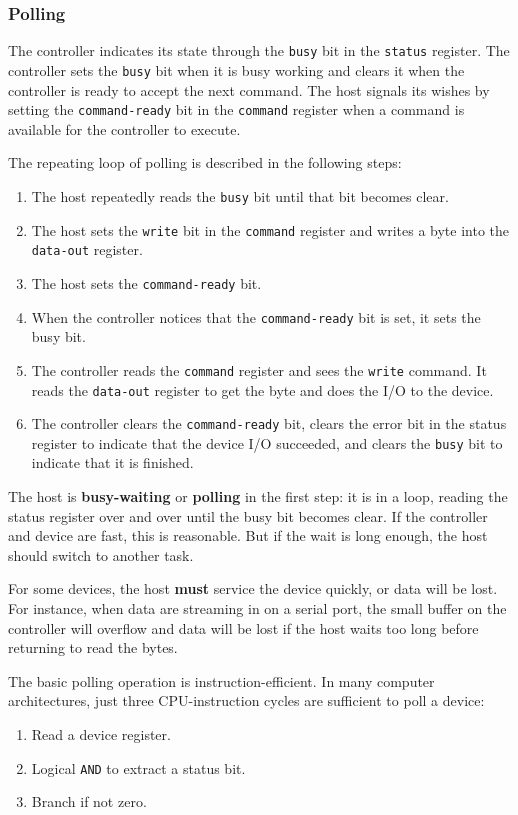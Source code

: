\subsubsection{Polling}\label{subsubsec:Polling}
The controller indicates its state through the \texttt{busy} bit in the \texttt{status} register.
The controller sets the \texttt{busy} bit when it is busy working and clears it when the controller is ready to accept the next command.
The host signals its wishes by setting the \texttt{command-ready} bit in the \texttt{command} register when a command is available for the controller to execute.

The repeating loop of polling is described in the following steps:
\begin{enumerate}[noitemsep]
\item The host repeatedly reads the \texttt{busy} bit until that bit becomes clear.
\item The host sets the \texttt{write} bit in the \texttt{command} register and writes a byte into the \texttt{data-out} register.
\item The host sets the \texttt{command-ready} bit.
\item When the controller notices that the \texttt{command-ready} bit is set, it sets the busy bit.
\item The controller reads the \texttt{command} register and sees the \texttt{write} command.
  It reads the \texttt{data-out} register to get the byte and does the I/O to the device.
\item The controller clears the \texttt{command-ready} bit, clears the error bit in the status register to indicate that the device I/O succeeded, and clears the \texttt{busy} bit to indicate that it is finished.
\end{enumerate}

The host is \textbf{busy-waiting} or \textbf{polling} in the first step: it is in a loop, reading the status register over and over until the busy bit becomes clear.
If the controller and device are fast, this is reasonable.
But if the wait is long enough, the host should switch to another task.

For some devices, the host \textbf{must} service the device quickly, or data will be lost.
For instance, when data are streaming in on a serial port, the small buffer on the controller will overflow and data will be lost if the host waits too long before returning to read the bytes.

The basic polling operation is instruction-efficient.
In many computer architectures, just three CPU-instruction cycles are sufficient to poll a device:
\begin{enumerate}[noitemsep]
\item Read a device register.
\item Logical \texttt{AND} to extract a status bit.
\item Branch if not zero.
\end{enumerate}


